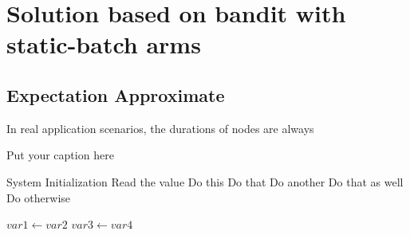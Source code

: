\section{Solution based on bandit with static-batch arms }
\label{sec:alg}

\subsection{Expectation Approximate}
\par In real application scenarios, the durations of nodes are always  


\begin{algorithm}[H]
\caption{Put your caption here}
\begin{algorithmic}[1]

       
    \State System Initialization
    \State Read the value 
        \State Do this
        \State Do that
        \State Do another
        \State Do that as well
        \Else
        \State Do otherwise
        \EndIf
    \EndIf

      
        \State $var1 \leftarrow var2$  
        \State $var3 \leftarrow var4$
    \EndWhile  \label{roy's loop}
\EndProcedure
\end{algorithmic}
\end{algorithm}



